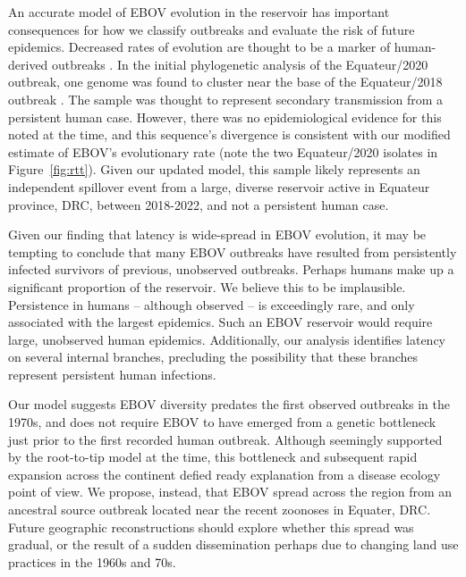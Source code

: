 \documentclass[11pt,a4paper]{article}
\begin{document}
An accurate model of EBOV evolution in the reservoir has important consequences for how we classify outbreaks and evaluate the risk of future epidemics. 
Decreased rates of evolution are thought to be a marker of human-derived outbreaks \cite{Garry2021-mw}.
In the initial phylogenetic analysis of the Equateur/2020 outbreak, one genome was found to cluster near the base of the Equateur/2018 outbreak \cite{Kinganda-Lusamaki2024-kg}.
The sample was thought to represent secondary transmission from a persistent human case.
However, there was no epidemiological evidence for this noted at the time, and this sequence's divergence is consistent with our modified estimate of EBOV's evolutionary rate (note the two Equateur/2020 isolates in Figure~\ref{fig:rtt}).
Given our updated model, this sample likely represents an independent spillover event from a large, diverse reservoir active in Equateur province, DRC, between 2018-2022, and not a persistent human case.

Given our finding that latency is wide-spread in EBOV evolution, it may be tempting to conclude that many EBOV outbreaks have resulted from persistently infected survivors of previous, unobserved outbreaks.
Perhaps humans make up a significant proportion of the reservoir.
We believe this to be implausible.
Persistence in humans -- although observed -- is exceedingly rare, and only associated with the largest epidemics. 
Such an EBOV reservoir would require large, unobserved human epidemics.
Additionally, our analysis identifies latency on several internal branches, precluding the possibility that these branches represent persistent human infections.

Our model suggests EBOV diversity predates the first observed outbreaks in the 1970s, and does not require EBOV to have emerged from a genetic bottleneck just prior to the first recorded human outbreak.
Although seemingly supported by the root-to-tip model at the time, this bottleneck and subsequent rapid expansion across the continent defied ready explanation from a disease ecology point of view.
We propose, instead, that EBOV spread across the region from an ancestral source outbreak located near the recent zoonoses in Equater, DRC.
Future geographic reconstructions should explore whether this spread was gradual, or the result of a sudden dissemination perhaps due to changing land use practices in the 1960s and 70s.
\end{document}
